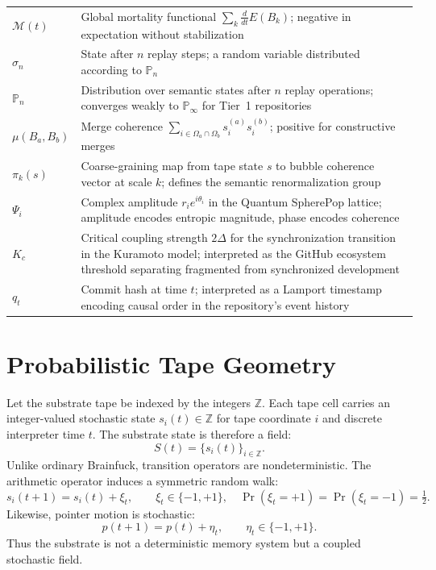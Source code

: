 \documentclass[11pt]{article}
\begin{document}
\begin{center}
\begin{tabular}{lp{9.5cm}}
$\mathcal{M}(t)$ & Global mortality functional $\sum_k \frac{d}{dt} E(B_k)$;
  negative in expectation without stabilization \\
$\sigma_n$ & State after $n$ replay steps; a random variable distributed
  according to $\mathbb{P}_n$ \\
$\mathbb{P}_n$ & Distribution over semantic states after $n$ replay
  operations; converges weakly to $\mathbb{P}_\infty$ for Tier~1 repositories \\
$\mu(B_a, B_b)$ & Merge coherence $\sum_{i \in \Omega_a \cap \Omega_b}
  s_i^{(a)} s_i^{(b)}$; positive for constructive merges \\
$\pi_k(s)$ & Coarse-graining map from tape state $s$ to bubble coherence
  vector at scale $k$; defines the semantic renormalization group \\
$\Psi_i$ & Complex amplitude $r_i e^{i\theta_i}$ in the Quantum SpherePop
  lattice; amplitude encodes entropic magnitude, phase encodes coherence \\
$K_c$ & Critical coupling strength $2\Delta$ for the synchronization
  transition in the Kuramoto model; interpreted as the GitHub ecosystem
  threshold separating fragmented from synchronized development \\
$q_t$ & Commit hash at time $t$; interpreted as a Lamport timestamp encoding
  causal order in the repository's event history \\
\bottomrule
\end{tabular}
\end{center}
\medskip

\appendix

\section{Probabilistic Tape Geometry}
\label{sec:tapegeom}

Let the substrate tape be indexed by the integers $\mathbb{Z}$. Each tape cell
carries an integer-valued stochastic state $s_i(t) \in \mathbb{Z}$ for tape
coordinate $i$ and discrete interpreter time $t$. The substrate state is
therefore a field:
\[
S(t) = \{ s_i(t) \}_{i \in \mathbb{Z}}.
\]
Unlike ordinary Brainfuck, transition operators are nondeterministic. The
arithmetic operator induces a symmetric random walk:
\[
s_i(t+1) = s_i(t) + \xi_t, \qquad
\xi_t \in \{-1,+1\}, \quad
\Pr(\xi_t = +1) = \Pr(\xi_t = -1) = \tfrac{1}{2}.
\]
Likewise, pointer motion is stochastic:
\[
p(t+1) = p(t) + \eta_t, \qquad \eta_t \in \{-1,+1\}.
\]
Thus the substrate is not a deterministic memory system but a coupled stochastic
field.
\end{document}
